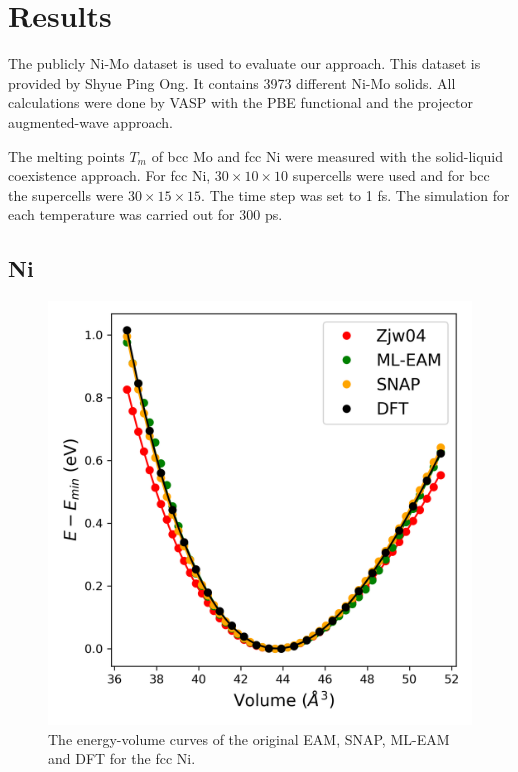 \documentclass[prb,reprint]{revtex4-2}
\begin{document}
% 
%
\section{Results}
\label{sec:results}

The publicly Ni-Mo dataset is used to evaluate our approach. This dataset is 
provided by Shyue Ping Ong. It contains 3973 different Ni-Mo solids. All 
calculations were done by VASP with the PBE functional and the projector 
augmented-wave approach. 

The melting points $T_{m}$ of bcc Mo and fcc Ni were measured with the 
solid-liquid coexistence approach. For fcc Ni, $30 \times 10 \times 10$ 
supercells were used and for bcc the supercells were $30 \times 15 \times 15$. 
The time step was set to 1 fs. The simulation for each temperature was carried 
out for 300 ps.

% 
%
\subsection{Ni}
\label{sec:elementary_Ni}

% 
%
\begin{figure}[htp]
\centering
\includegraphics[scale=0.65]{figures/Ni_all_eos.png}
\caption{\label{fig:Ni_eam_eos} The energy-volume curves of the original EAM, 
SNAP, ML-EAM and DFT for the fcc Ni.}
\end{figure}
\end{document}
